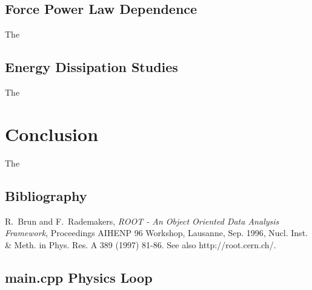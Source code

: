 \documentclass[aps,prl,floatfix,preprint,nofootinbib]{revtex4}
\begin{document}
\subsection{Force Power Law Dependence}
The

\subsection{Energy Dissipation Studies}
The


\section{Conclusion}
The

\clearpage
\begin{thebibliography}{9}
\section{Bibliography}
  R.~Brun and F.~Rademakers, \emph{ROOT - An Object Oriented Data Analysis Framework}, Proceedings AIHENP 96 Workshop, Lausanne, Sep. 1996, Nucl. Inst. \& Meth. in Phys. Res. A 389 (1997) 81-86. See also http://root.cern.ch/.

\end{thebibliography}

\clearpage
\begin{appendices}
  \singlespacing
  \section{main.cpp Physics Loop} \label{sec:main.cpp}

\end{appendices}
\end{document}
